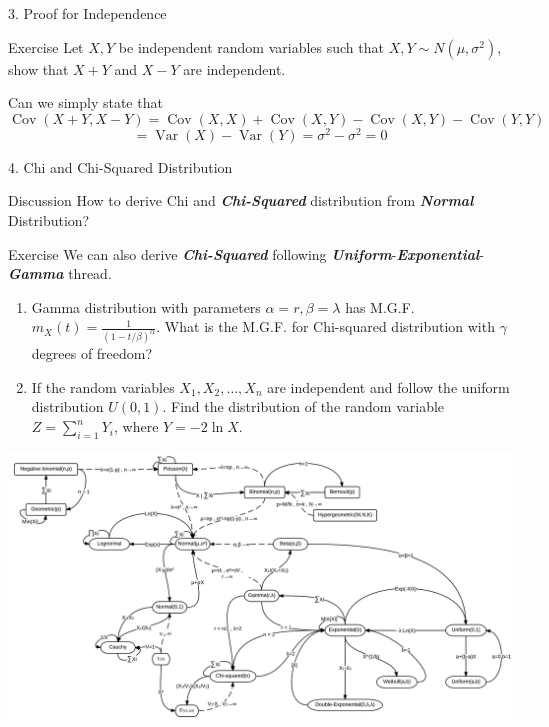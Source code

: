 \documentclass{beamer}
\newcommand{\bb}[1]{\textcolor{antiquefuchsia}{\textbf{\textit{#1}}}}
\begin{document}
\begin{frame}{3. Proof for Independence}
\begin{block}{Exercise}
Let $X, Y$ be independent random variables such that $X, Y \sim N\left(\mu, \sigma^{2}\right)$, show that $X+Y$ and $X-Y$ are independent.
\end{block}
Can we simply state that $$\operatorname{Cov}(X+Y,X-Y)=\operatorname{Cov}(X,X)+\operatorname{Cov}(X,Y)-\operatorname{Cov}(X,Y)-\operatorname{Cov}(Y,Y)$$
$$=\operatorname{Var}(X)-\operatorname{Var}(Y)=\sigma^2-\sigma^2=0$$
\end{frame}

\begin{frame}{4. Chi and Chi-Squared Distribution}
\begin{block}{Discussion}
How to derive Chi and \bb{Chi-Squared} distribution from \bb{Normal} Distribution?
\end{block}
\begin{block}{Exercise}
We can also derive \bb{Chi-Squared} following \bb{Uniform}-\bb{Exponential}-\bb{Gamma} thread.
\begin{enumerate}
\item Gamma distribution with parameters $\alpha=r,\beta=\lambda$ has M.G.F. $m_X(t)=\frac{1}{(1-t/\beta)^\alpha}$. What is the M.G.F. for Chi-squared distribution with $\gamma$ degrees of freedom?

\item If the random variables $X_{1}, X_{2}, \ldots, X_{n}$ are independent and follow the uniform distribution $U(0,1)$. Find the distribution of the random variable $Z=\sum_{i=1}^{n} Y_{i}$, where $Y=-2 \ln X$.
\end{enumerate}
\end{block}
\end{frame}

\begin{frame}
\includegraphics[scale=0.48]{diagram.jpg}
\end{frame}
\restoregeometry
\end{document}
